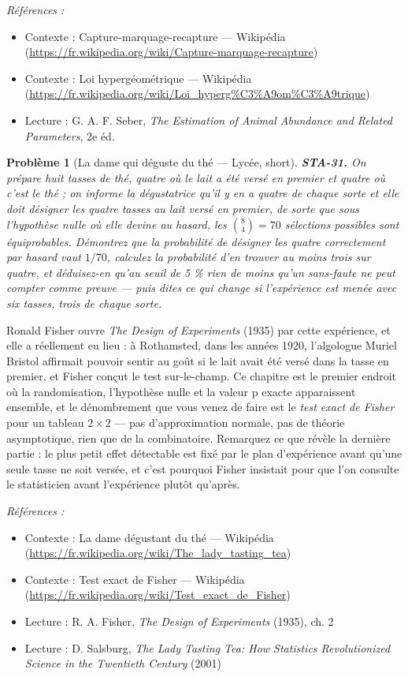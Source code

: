\documentclass[11pt]{article}
\newtheorem{problem}{Problème}
\newenvironment{refs}{\par\small\noindent\emph{Références :}\begin{itemize}\setlength\itemsep{0pt}}{\end{itemize}\normalsize}
\begin{document}
\begin{refs}
\item Contexte : Capture-marquage-recapture --- Wikipédia (\url{https://fr.wikipedia.org/wiki/Capture-marquage-recapture})
\item Contexte : Loi hypergéométrique --- Wikipédia (\url{https://fr.wikipedia.org/wiki/Loi_hyperg%C3%A9om%C3%A9trique})
\item Lecture : G. A. F. Seber, \textit{The Estimation of Animal Abundance and Related Parameters}, 2e éd.
\end{refs}

\bigskip

\begin{problem}[{La dame qui déguste du thé --- Lycée, short}]
\textbf{STA-31.} On prépare huit tasses de thé, quatre où le lait a été versé
en premier et quatre où c'est le thé ; on informe la dégustatrice qu'il y en a quatre de chaque
sorte et elle doit désigner les quatre tasses au lait versé en premier, de sorte que sous
l'hypothèse nulle où elle devine au hasard, les $ \binom{8}{4} = 70 $ sélections possibles sont
équiprobables. Démontrez que la probabilité de désigner les quatre correctement par hasard vaut
$ 1/70 $, calculez la probabilité d'en trouver au moins trois sur quatre, et déduisez-en qu'au
seuil de 5 \% rien de moins qu'un sans-faute ne peut compter comme preuve --- puis dites ce qui change
si l'expérience est menée avec six tasses, trois de chaque sorte.
\end{problem}

\noindent Ronald Fisher ouvre \textit{The Design of Experiments} (1935) par cette
expérience, et elle a réellement eu lieu : à Rothamsted, dans les années 1920, l'algologue Muriel
Bristol affirmait pouvoir sentir au goût si le lait avait été versé dans la tasse en premier, et
Fisher conçut le test sur-le-champ. Ce chapitre est le premier endroit où la randomisation,
l'hypothèse nulle et la valeur p exacte apparaissent ensemble, et le dénombrement que vous venez de
faire est le \textit{test exact de Fisher} pour un tableau $ 2 \times 2 $ --- pas d'approximation
normale, pas de théorie asymptotique, rien que de la combinatoire. Remarquez ce que révèle la
dernière partie : le plus petit effet détectable est fixé par le plan d'expérience avant qu'une
seule tasse ne soit versée, et c'est pourquoi Fisher insistait pour que l'on consulte le
statisticien avant l'expérience plutôt qu'après.

\begin{refs}
\item Contexte : La dame dégustant du thé --- Wikipédia (\url{https://fr.wikipedia.org/wiki/The_lady_tasting_tea})
\item Contexte : Test exact de Fisher --- Wikipédia (\url{https://fr.wikipedia.org/wiki/Test_exact_de_Fisher})
\item Lecture : R. A. Fisher, \textit{The Design of Experiments} (1935), ch. 2
\item Lecture : D. Salsburg, \textit{The Lady Tasting Tea: How Statistics Revolutionized Science in the Twentieth Century} (2001)
\end{refs}
\end{document}
